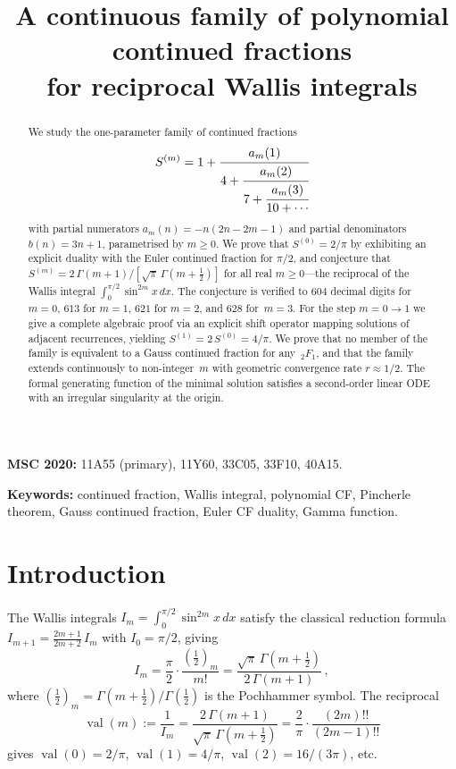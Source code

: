 \documentclass[11pt]{article}
\title{A continuous family of polynomial continued fractions\\
for reciprocal Wallis integrals}
\author{}
\date{}
\newcommand{\half}{\tfrac{1}{2}}
\newcommand{\val}{\operatorname{val}}
\theoremstyle{definition}
\theoremstyle{remark}
\begin{document}
\maketitle

\begin{abstract}
We study the one-parameter family of continued fractions
\[
  S^{(m)} = 1 + \cfrac{a_m(1)}{4 + \cfrac{a_m(2)}{7 + \cfrac{a_m(3)}{10+\cdots}}}
\]
with partial numerators $a_m(n) = -n(2n-2m-1)$ and partial denominators
$b(n) = 3n+1$, parametrised by $m \geq 0$.
We prove that $S^{(0)} = 2/\pi$ by exhibiting an explicit duality with the
Euler continued fraction for $\pi/2$, and conjecture that
$S^{(m)} = 2\,\Gamma(m{+}1)/[\sqrt{\pi}\,\Gamma(m{+}\half)]$
for all real $m \geq 0$---the reciprocal of the Wallis integral
$\int_0^{\pi/2}\sin^{2m}x\,dx$.
The conjecture is verified to
$604$ decimal digits for $m=0$, $613$ for $m=1$,
$621$ for $m=2$, and $628$ for~$m=3$.
For the step $m{=}0 \to 1$ we give a complete algebraic proof via
an explicit shift operator mapping solutions of adjacent recurrences,
yielding $S^{(1)} = 2\,S^{(0)} = 4/\pi$.
We prove that no member of the family is equivalent to a Gauss
continued fraction for any~${}_2F_1$, and that the family extends
continuously to non-integer~$m$ with geometric convergence rate $r \approx 1/2$.
The formal generating function of the minimal solution satisfies
a second-order linear ODE with an irregular singularity at the origin.
\end{abstract}

\noindent\textbf{MSC 2020:}
11A55 (primary), 11Y60, 33C05, 33F10, 40A15.

\medskip\noindent\textbf{Keywords:}
continued fraction, Wallis integral, polynomial CF, Pincherle theorem,
Gauss continued fraction, Euler CF duality, Gamma function.

\section{Introduction}\label{sec:intro}

The Wallis integrals $I_m = \int_0^{\pi/2}\sin^{2m}x\,dx$ satisfy
the classical reduction formula $I_{m+1} = \frac{2m+1}{2m+2}\,I_m$
with $I_0 = \pi/2$, giving
\begin{equation}\label{eq:wallis}
  I_m = \frac{\pi}{2}\cdot\frac{(\half)_m}{m!}
      = \frac{\sqrt{\pi}\,\Gamma(m{+}\half)}{2\,\Gamma(m{+}1)}\,,
\end{equation}
where $(\half)_m = \Gamma(m{+}\half)/\Gamma(\half)$ is the
Pochhammer symbol.  The reciprocal
\begin{equation}\label{eq:valm}
  \val(m) := \frac{1}{I_m}
  = \frac{2\,\Gamma(m{+}1)}{\sqrt{\pi}\,\Gamma(m{+}\half)}
  = \frac{2}{\pi}\cdot\frac{(2m)!!}{(2m{-}1)!!}
\end{equation}
gives $\val(0) = 2/\pi$, $\val(1) = 4/\pi$,
$\val(2) = 16/(3\pi)$, etc.
\end{document}
